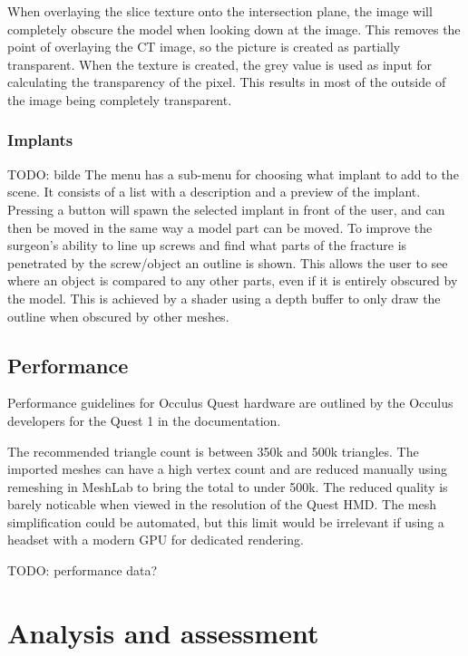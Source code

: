 \documentclass[a4paper]{report}
\begin{document}
When overlaying the slice texture onto the intersection plane, the image will completely obscure the model when looking down at the image. This removes the point of overlaying the CT image, so the picture is created as partially transparent. When the texture is created, the grey value is used as input for calculating the transparency of the pixel. This results in most of the outside of the image being completely transparent.

\subsection{Implants}
TODO: bilde
The menu has a sub-menu for choosing what implant to add to the scene. It consists of a list with a description and a preview of the implant. Pressing a button will spawn the selected implant in front of the user, and can then be moved in the same way a model part can be moved.
To improve the surgeon's ability to line up screws and find what parts of the fracture is penetrated by the screw/object an outline is shown. This allows the user to see where an object is compared to any other parts, even if it is entirely obscured by the model. This is achieved by a shader using a depth buffer to only draw the outline when obscured by other meshes\cite{technologies_unity_nodate-1}.

\section{Performance}
Performance guidelines for Occulus Quest hardware are outlined by the Occulus developers for the Quest 1 in the documentation\cite{noauthor_oculus_nodate}.

The recommended triangle count is between 350k and 500k triangles\cite{noauthor_oculus_nodate}. The imported meshes can have a high vertex count and are reduced manually using remeshing in MeshLab\cite{cignoni_meshlab_2008} to bring the total to under 500k. The reduced quality is barely noticable when viewed in the resolution of the Quest HMD.
The mesh simplification could be automated, but this limit would be irrelevant if using a headset with a modern GPU for dedicated rendering.

TODO: performance data?

\chapter{Analysis and assessment}\label{analysis and assessment}
\end{document}
